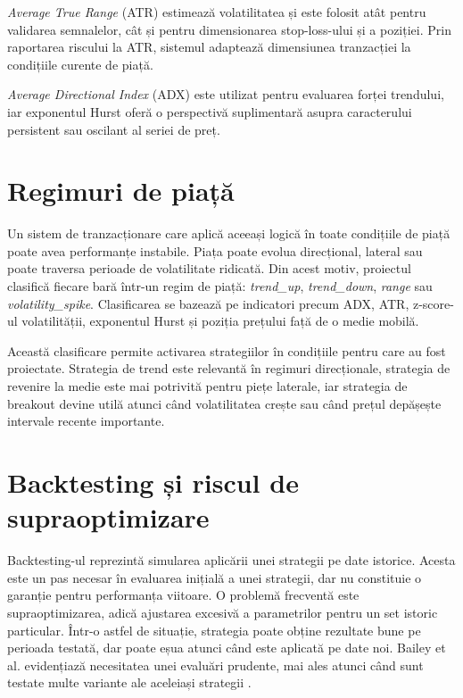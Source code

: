 \textit{Average True Range} (ATR) estimează volatilitatea și este folosit atât pentru validarea semnalelor, cât și pentru dimensionarea stop-loss-ului și a poziției. Prin raportarea riscului la ATR, sistemul adaptează dimensiunea tranzacției la condițiile curente de piață.

\textit{Average Directional Index} (ADX) este utilizat pentru evaluarea forței trendului, iar exponentul Hurst oferă o perspectivă suplimentară asupra caracterului persistent sau oscilant al seriei de preț.

\section{Regimuri de piață}
\label{cap:cap2:regimuri}

Un sistem de tranzacționare care aplică aceeași logică în toate condițiile de piață poate avea performanțe instabile. Piața poate evolua direcțional, lateral sau poate traversa perioade de volatilitate ridicată. Din acest motiv, proiectul clasifică fiecare bară într-un regim de piață: \textit{trend\_up}, \textit{trend\_down}, \textit{range} sau \textit{volatility\_spike}. Clasificarea se bazează pe indicatori precum ADX, ATR, z-score-ul volatilității, exponentul Hurst și poziția prețului față de o medie mobilă.

Această clasificare permite activarea strategiilor în condițiile pentru care au fost proiectate. Strategia de trend este relevantă în regimuri direcționale, strategia de revenire la medie este mai potrivită pentru piețe laterale, iar strategia de breakout devine utilă atunci când volatilitatea crește sau când prețul depășește intervale recente importante.

\section{Backtesting și riscul de supraoptimizare}
\label{cap:cap2:backtesting}

Backtesting-ul reprezintă simularea aplicării unei strategii pe date istorice. Acesta este un pas necesar în evaluarea inițială a unei strategii, dar nu constituie o garanție pentru performanța viitoare. O problemă frecventă este supraoptimizarea, adică ajustarea excesivă a parametrilor pentru un set istoric particular. Într-o astfel de situație, strategia poate obține rezultate bune pe perioada testată, dar poate eșua atunci când este aplicată pe date noi. Bailey et al. evidențiază necesitatea unei evaluări prudente, mai ales atunci când sunt testate multe variante ale aceleiași strategii \cite{art:bailey:backtest}.

